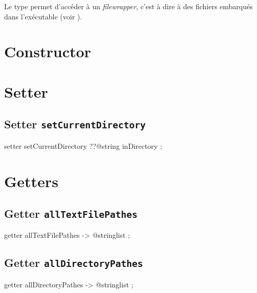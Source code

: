 

Le type  permet d'accéder à un \emph{filewrapper}, c'est à dire à des fichiers embarqués dans l'exécutable (voir ).

\section{Constructor}

\section{Setter}

\subsection{Setter \texttt{setCurrentDirectory}}

\begin{galgascode}
setter setCurrentDirectory ??@string inDirectory ;
\end{galgascode}


\section{Getters}




\subsection{Getter \texttt{allTextFilePathes}}

\begin{galgascode}
getter allTextFilePathes -> @stringlist ;
\end{galgascode}






\subsection{Getter \texttt{allDirectoryPathes}}

\begin{galgascode}
getter allDirectoryPathes -> @stringlist ;
\end{galgascode}






